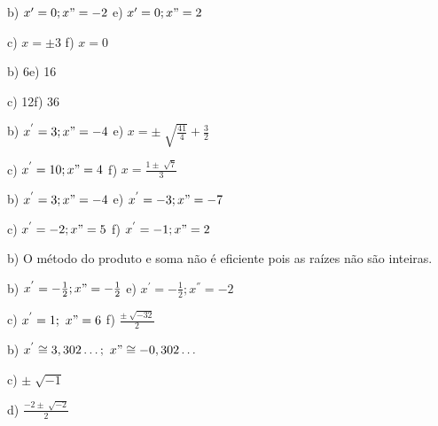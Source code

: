 \begin{respostas}{4}



    \quad b)  \( x'=0;x"=-2 \) \quad \quad \quad \quad e)  \( x'=0;x"=2 \)

    \quad c)  \( x= \pm 3  \) \quad \quad \quad \quad \quad f)  \( x=0 \)


    \quad b) 6\quad \quad \quad \quad \quad e) 16

    \quad c) 12\quad \quad \quad \quad \quad f) 36\quad


    \quad b)  \( x^{'}=3;x"=-4 \) \quad \quad \quad e)  \( x= \pm \sqrt[]{\frac{41}{4}}+\frac{3}{2} \)

    \quad c)  \( x^{'}=10;x"=4 \) \quad \quad \quad f)  \( x=\frac{1 \pm \sqrt[]{7}}{3} \)


    \quad b)  \( x^{'}=3;x"=-4 \) \quad \quad \quad e)  \( x^{'}=-3;x"=-7 \)

    \quad c)  \( x^{'}=-2;x"=5 \) \quad \quad \quad f)  \( x^{'}=-1;x"=2 \)


    b) O método do produto e soma não é eficiente pois as raízes não são inteiras.


    \quad b)  \( x^{'}=-\frac{1}{2};x"=-\frac{1}{2} \) \quad \quad \quad e)  \( x^{'}=-\frac{1}{2};x^{''}=-2 \)

    \quad c)  \( x^{'}=1;~x"=6 \) \quad \quad \quad \quad f)  \( \frac{ \pm \sqrt[]{-32}}{2} \)


    \addtocounter{enumi}{2}

    \quad b)  \( x^{'} \cong 3,302 \ldots ;~x" \cong -0,302 \ldots  \)

    \quad c)  \(  \pm \sqrt[]{-1} \)

    \quad d)  \( \frac{-2 \pm \sqrt[]{-2}}{2} \)

\end{respostas}